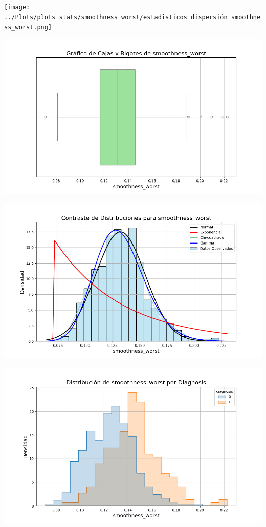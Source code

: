 \documentclass[a4paper, 12pt]{article}
\begin{document}
\texttt{[image: ../Plots/plots\_stats/smoothness\_worst/estadisticos\_dispersión\_smoothness\_worst.png]}



\includegraphics[width=\textwidth]{../Plots/plots_stats/smoothness_worst/boxplot_smoothness_worst.png}




\includegraphics[width=\textwidth]{../Plots/plots_stats/smoothness_worst/distribuciones_conocidas_smoothness_worst.png}

\includegraphics[width=\textwidth]{../Plots/plots_diagnosis/distribucion_smoothness_worst_por_diagnosis.png}
\end{document}
